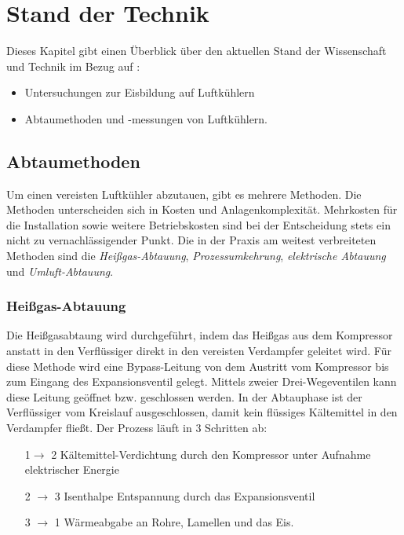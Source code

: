 \chapter{Stand der Technik}
\label{cha:Stand der Technik}



Dieses Kapitel gibt einen Überblick über den aktuellen Stand der Wissenschaft und Technik im Bezug auf :
\begin{itemize}
\item Untersuchungen zur Eisbildung auf Luftkühlern
\item Abtaumethoden und -messungen von Luftkühlern.
\end{itemize}

\section{Abtaumethoden}
\label{sec: Abtaumethoden}

Um einen vereisten Luftkühler abzutauen, gibt es mehrere Methoden. Die Methoden unterscheiden sich in Kosten und Anlagenkomplexität. Mehrkosten für die Installation sowie weitere Betriebskosten sind bei der Entscheidung stets ein nicht zu vernachlässigender Punkt.
Die in der Praxis am weitest verbreiteten Methoden sind  die \textit{Heißgas-Abtauung}, \textit{Prozessumkehrung}, \textit{elektrische Abtauung} und \textit{Umluft-Abtauung}.


\subsection*{Heißgas-Abtauung}

Die Heißgasabtaung wird durchgeführt, indem das Heißgas aus dem Kompressor anstatt in den Verflüssiger direkt in den vereisten Verdampfer geleitet wird. Für diese Methode wird eine Bypass-Leitung von dem Austritt vom Kompressor bis zum Eingang des Expansionsventil gelegt. Mittels zweier Drei-Wegeventilen kann diese Leitung geöffnet bzw. geschlossen werden. In der Abtauphase ist der Verflüssiger vom Kreislauf ausgeschlossen, damit kein flüssiges Kältemittel in den Verdampfer fließt. \citep{Baehr2013}
Der Prozess läuft in 3 Schritten ab:

\begin{itemize}
\item[1$\longrightarrow$ 2] Kältemittel-Verdichtung durch den Kompressor unter Aufnahme elektrischer Energie

\item[2 $\longrightarrow$ 3] Isenthalpe Entspannung durch das Expansionsventil

\item[3 $\longrightarrow$ 1] Wärmeabgabe an Rohre, Lamellen und das Eis. 
\end{itemize}



